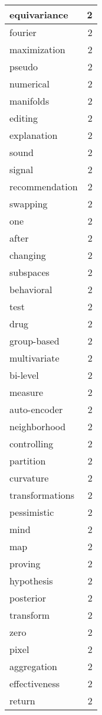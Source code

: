 \begin{table}[h]
\begin{tabular}{|l|r|}
equivariance & 2 \\
\hline
fourier & 2 \\
\hline
maximization & 2 \\
\hline
pseudo & 2 \\
\hline
numerical & 2 \\
\hline
manifolds & 2 \\
\hline
editing & 2 \\
\hline
explanation & 2 \\
\hline
sound & 2 \\
\hline
signal & 2 \\
\hline
recommendation & 2 \\
\hline
swapping & 2 \\
\hline
one & 2 \\
\hline
after & 2 \\
\hline
changing & 2 \\
\hline
subspaces & 2 \\
\hline
behavioral & 2 \\
\hline
test & 2 \\
\hline
drug & 2 \\
\hline
group-based & 2 \\
\hline
multivariate & 2 \\
\hline
bi-level & 2 \\
\hline
measure & 2 \\
\hline
auto-encoder & 2 \\
\hline
neighborhood & 2 \\
\hline
controlling & 2 \\
\hline
partition & 2 \\
\hline
curvature & 2 \\
\hline
transformations & 2 \\
\hline
pessimistic & 2 \\
\hline
mind & 2 \\
\hline
map & 2 \\
\hline
proving & 2 \\
\hline
hypothesis & 2 \\
\hline
posterior & 2 \\
\hline
transform & 2 \\
\hline
zero & 2 \\
\hline
pixel & 2 \\
\hline
aggregation & 2 \\
\hline
effectiveness & 2 \\
\hline
return & 2 \\
\hline

\end{tabular}
\end{table}
